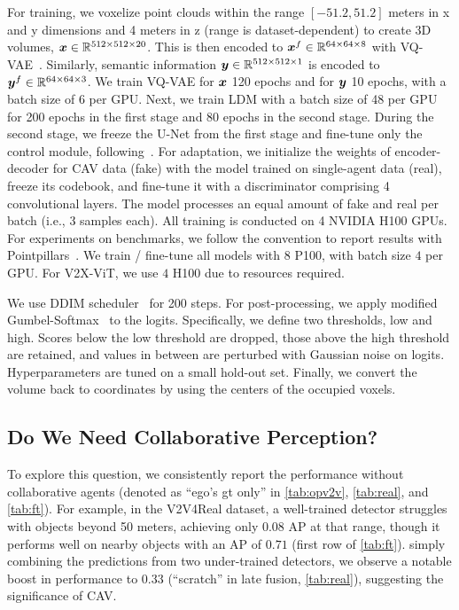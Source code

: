 For \ours training, we voxelize point clouds within the range $[-51.2, 51.2]$ meters in x and y dimensions and 4 meters in z (range is dataset-dependent) to create 3D volumes, ${\bm{x}} \in {\mathbb{R}}^{512 \times 512 \times 20}$. This is then encoded to ${\bm{x}}^f \in {\mathbb{R}}^{64 \times 64 \times 8}$ with VQ-VAE~\citep{van2017neural}. Similarly, semantic information ${\bm{y}} \in {\mathbb{R}}^{512 \times 512 \times 1}$ is encoded to ${\bm{y}}^f \in {\mathbb{R}}^{64 \times 64 \times 3}$. We train VQ-VAE for ${\bm{x}}$ 120 epochs and for ${\bm{y}}$ 10 epochs, with a batch size of 6 per GPU. Next, we train LDM with a batch size of 48 per GPU for 200 epochs in the first stage and 80 epochs in the second stage. During the second stage, we freeze the U-Net from the first stage and fine-tune only the control module, following~\citep{mou2024t2i}. For adaptation, we initialize the weights of encoder-decoder for CAV data (fake) with the model trained on single-agent data (real), freeze its codebook, and fine-tune it with a discriminator comprising 4 convolutional layers. The model processes an equal amount of fake and real per batch (i.e., 3 samples each). All training is conducted on 4 NVIDIA H100 GPUs. For experiments on benchmarks, we follow the convention to report results with Pointpillars~\citep{lang2019pointpillars}. We train / fine-tune all models with $8$ P100, with batch size $4$ per GPU. For V2X-ViT, we use $4$ H100 due to resources required. 



We use DDIM scheduler~\citep{song2020denoising} for 200 steps. For post-processing, we apply modified Gumbel-Softmax~\citep{jang2016categorical} to the logits. Specifically, we define two thresholds, low and high. Scores below the low threshold are dropped, those above the high threshold are retained, and values in between are perturbed with Gaussian noise on logits. Hyperparameters are tuned on a small hold-out set. Finally, we convert the volume back to coordinates by using the centers of the occupied voxels.




\subsection{Do We Need Collaborative Perception?}
\label{sec:question}
To explore this question, we consistently report the performance without collaborative agents (denoted as ``ego’s gt only'' in \cref{tab:opv2v}, \cref{tab:real}, and \cref{tab:ft}). For example, in the V2V4Real dataset, a well-trained detector struggles with objects beyond 50 meters, achieving only $0.08$ AP at that range, though it performs well on nearby objects with an AP of $0.71$ (\cf first row of \cref{tab:ft}). simply combining the predictions from two under-trained detectors, we observe a notable boost in performance to $0.33$ (\cf ``scratch'' in late fusion, \cref{tab:real}), suggesting the significance of CAV.


